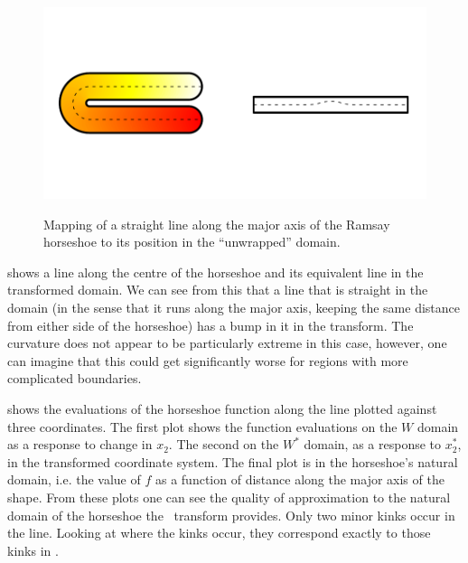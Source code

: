 \begin{figure}[t]
\centering
\includegraphics[trim=0.5in 1in 0in 1in]{sc/figs/horseshoecentreline.pdf} \\
\caption{Mapping of a straight line along the major axis of the Ramsay horseshoe to its position in the ``unwrapped'' domain.}
\label{horseshoecentreline}
\end{figure}

 shows a line along the centre of the horseshoe and its equivalent line in the transformed domain. We can see from this that a line that is straight in the domain (in the sense that it runs along the major axis, keeping the same distance from either side of the horseshoe) has a bump in it in the transform. The curvature does not appear to be particularly extreme in this case, however, one can imagine that this could get significantly worse for regions with more complicated boundaries.

 shows the evaluations of the horseshoe function along the line plotted against three coordinates. The first plot shows the function evaluations on the $W$ domain as a response to change in $x_2$. The second on the $W^*$ domain, as a response to $x_2^*$, in the transformed coordinate system. The final plot is in the horseshoe's natural domain, i.e. the value of $f$ as a function of distance along the major axis of the shape. From these plots one can see the quality of approximation to the natural domain of the horseshoe the \sch\ transform provides. Only two minor kinks occur in the line. Looking at where the kinks occur, they correspond exactly to those kinks in . 

